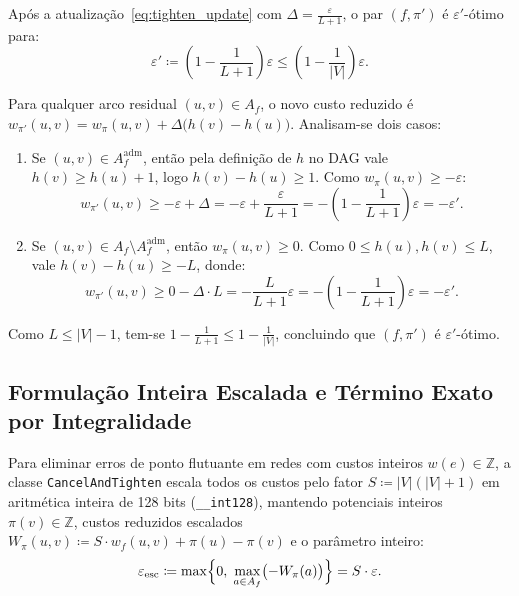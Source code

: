 \begin{prop}\label{prop:tighten_eps}
Após a atualização~\eqref{eq:tighten_update} com $\Delta = \frac{\varepsilon}{L + 1}$, o par $(f, \pi')$ é $\varepsilon'$-ótimo para:
\begin{equation}
    \varepsilon' \coloneqq \left(1 - \frac{1}{L + 1}\right)\varepsilon \le \left(1 - \frac{1}{|V|}\right)\varepsilon.
\end{equation}
\end{prop}

\begin{demonstracao}
Para qualquer arco residual $(u,v) \in A_f$, o novo custo reduzido é $w_{\pi'}(u,v) = w_\pi(u,v) + \Delta\bigl(h(v) - h(u)\bigr)$. Analisam-se dois casos:
\begin{enumerate}
    \item Se $(u,v) \in A_f^{\text{adm}}$, então pela definição de $h$ no DAG vale $h(v) \ge h(u) + 1$, logo $h(v) - h(u) \ge 1$. Como $w_\pi(u,v) \ge -\varepsilon$:
    \begin{equation*}
        w_{\pi'}(u,v) \ge -\varepsilon + \Delta = -\varepsilon + \frac{\varepsilon}{L + 1} = -\left(1 - \frac{1}{L + 1}\right)\varepsilon = -\varepsilon'.
    \end{equation*}
    \item Se $(u,v) \in A_f \setminus A_f^{\text{adm}}$, então $w_\pi(u,v) \ge 0$. Como $0 \le h(u), h(v) \le L$, vale $h(v) - h(u) \ge -L$, donde:
    \begin{equation*}
        w_{\pi'}(u,v) \ge 0 - \Delta \cdot L = -\frac{L}{L + 1}\varepsilon = -\left(1 - \frac{1}{L + 1}\right)\varepsilon = -\varepsilon'.
    \end{equation*}
\end{enumerate}
Como $L \le |V| - 1$, tem-se $1 - \frac{1}{L+1} \le 1 - \frac{1}{|V|}$, concluindo que $(f, \pi')$ é $\varepsilon'$-ótimo.
\end{demonstracao}


\subsection{Formulação Inteira Escalada e Término Exato por Integralidade}

Para eliminar erros de ponto flutuante em redes com custos inteiros $w(e) \in \mathbb{Z}$, a classe \lstinline{CancelAndTighten} escala todos os custos pelo fator $S \coloneqq |V|(|V| + 1)$ em aritmética inteira de 128 bits (\lstinline{__int128}), mantendo potenciais inteiros $\pi(v) \in \mathbb{Z}$, custos reduzidos escalados $W_\pi(u,v) \coloneqq S \cdot w_f(u,v) + \pi(u) - \pi(v)$ e o parâmetro inteiro:
\begin{equation}
    \varepsilon_{\text{esc}} \coloneqq \max\Bigl\{0,\; \max_{a \in A_f} \bigl(-W_\pi(a)\bigr)\Bigr\} = S \cdot \varepsilon.
\end{equation}

